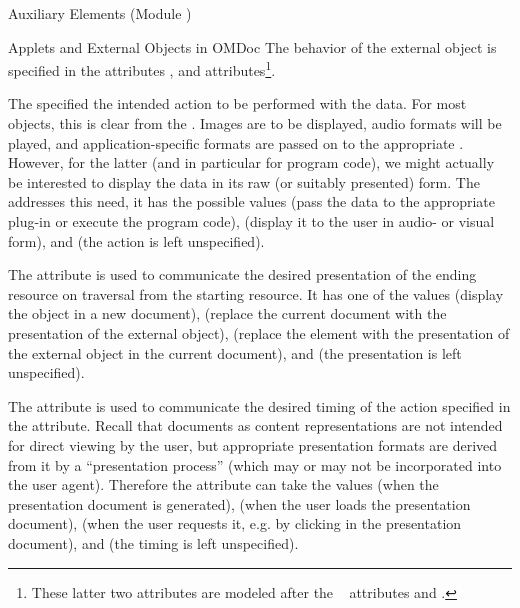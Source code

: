 \begin{tchapter}[id=ext,short=Auxiliary Elements]{Auxiliary Elements (Module {})}
\begin{tsection}[id=applets]{Applets and External Objects in OMDoc}
  The behavior of the external object is specified in the attributes
  {}, {} and {}
  attributes\footnote{These latter two attributes are modeled after the
    {\xlink}~\cite{DeRMal:xlink01} attributes {} and
    {}.}.
  
  The {} specified the intended action to be performed with the
  data. For most objects, this is clear from the {}. Images are to be
  displayed, audio formats will be played, and application-specific formats are passed on
  to the appropriate {}. However, for the latter (and in particular for
  program code), we might actually be interested to display the data in its raw (or
  suitably presented) form. The {} addresses this need, it has
  the possible values {} (pass the data to the appropriate
  plug-in or execute the program code), {} (display it to
  the user in audio- or visual form), and {} (the action is
  left unspecified).
  
  The {} attribute is used to communicate the desired presentation
  of the ending resource on traversal from the starting resource. It has one of the values
  {} (display the object in a new document),
  {} (replace the current document with the presentation of
  the external object), {} (replace the {}
  element with the presentation of the external object in the current document), and
  {} (the presentation is left unspecified).
  
  The {} attribute is used to communicate the desired timing of
  the action specified in the {} attribute.  Recall that {\omdoc}
  documents as content representations are not intended for direct viewing by the user,
  but appropriate presentation formats are derived from it by a ``presentation process''
  (which may or may not be incorporated into the user agent). Therefore the
  {} attribute can take the values
  {} (when the presentation document is generated),
  {} (when the user loads the presentation document),
  {} (when the user requests it, e.g. by clicking in the
  presentation document), and {} (the timing is left
  unspecified).
  

\end{tsection}
\end{tchapter}

